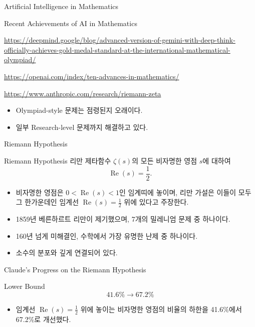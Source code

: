 \documentclass[12pt,aspectratio=169]{beamer}
\newenvironment{mainitemize}{\begin{itemize}\setlength{\itemsep}{0.72em}}{\end{itemize}}
\begin{document}
\begin{frame}{Artificial Intelligence in Mathematics}
\begin{block}{Recent Achievements of AI in Mathematics}
{\scriptsize
\url{https://deepmind.google/blog/advanced-version-of-gemini-with-deep-think-officially-achieves-gold-medal-standard-at-the-international-mathematical-olympiad/}\par\medskip
\url{https://openai.com/index/ten-advances-in-mathematics/}\par\medskip
\url{https://www.anthropic.com/research/riemann-zeta}
}
\end{block}
\begin{mainitemize}
  \item Olympiad-style 문제는 점령된지 오래이다.
  \item 일부 Research-level 문제까지 해결하고 있다.
\end{mainitemize}
\end{frame}

\begin{frame}{Riemann Hypothesis}
\begin{block}{Riemann Hypothesis}
리만 제타함수 $\zeta(s)$의 모든 비자명한 영점 $s$에 대하여
\[
\operatorname{Re}(s)=\frac{1}{2}.
\]
\end{block}
\begin{mainitemize}
  \item 비자명한 영점은 $0<\operatorname{Re}(s)<1$인 임계띠에 놓이며, 리만 가설은 이들이 모두 그 한가운데인 임계선 $\operatorname{Re}(s)=\frac{1}{2}$ 위에 있다고 주장한다.
  \item 1859년 베른하르트 리만이 제기했으며, 7개의 밀레니엄 문제 중 하나이다.
  \item 160년 넘게 미해결인, 수학에서 가장 유명한 난제 중 하나이다.
  \item 소수의 분포와 깊게 연결되어 있다.
\end{mainitemize}
\end{frame}

\begin{frame}{Claude's Progress on the Riemann Hypothesis}
\begin{block}{Lower Bound}
\[
41.6\% \longrightarrow 67.2\%
\]
\end{block}
\begin{mainitemize}
  \item 임계선 $\operatorname{Re}(s)=\frac{1}{2}$ 위에 놓이는 비자명한 영점의 비율의 하한을 41.6\%에서 67.2\%로 개선했다.
\end{mainitemize}
\end{frame}
\end{document}
